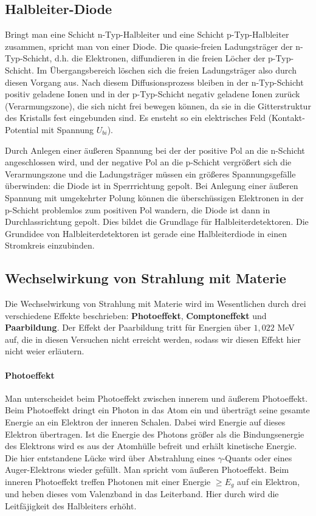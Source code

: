 \documentclass[12pt]{article}
\begin{document}
\subsection{Halbleiter-Diode}

Bringt man eine Schicht n-Typ-Halbleiter und eine Schicht p-Typ-Halbleiter zusammen, spricht man von einer Diode. Die quasie-freien Ladungsträger der n-Typ-Schicht, d.h. die Elektronen, diffundieren in die freien Löcher der p-Typ-Schicht. Im Übergangsbereich löschen sich die freien Ladungsträger also durch diesen Vorgang aus. 
Nach diesem Diffusionsprozess bleiben in der n-Typ-Schicht positiv geladene Ionen und in der p-Typ-Schicht negativ geladene Ionen zurück (Verarmungszone), die sich nicht frei bewegen können, da sie in die Gitterstruktur des Kristalls fest eingebunden sind. Es ensteht so ein elektrisches Feld (Kontakt-Potential mit Spannung $U_{bi}$). 

Durch Anlegen einer äußeren Spannung bei der der positive Pol an die n-Schicht angeschlossen wird, und der negative Pol an die p-Schicht vergrößert sich die Verarmungszone und die Ladungsträger müssen ein größeres Spannungsgefälle überwinden: die Diode ist in Sperrrichtung gepolt. Bei Anlegung einer äußeren Spannung mit umgekehrter Polung können die überschüssigen Elektronen in der p-Schicht problemlos zum positiven Pol wandern, die Diode ist dann in Durchlassrichtung gepolt.
Dies bildet die Grundlage für Halbleiterdetektoren. Die Grundidee von Halbleiterdetektoren ist gerade eine Halbleiterdiode in einen Stromkreis einzubinden.
\subsection{Wechselwirkung von Strahlung mit Materie}

Die Wechselwirkung von Strahlung mit Materie wird im Wesentlichen durch drei verschiedene Effekte beschrieben: \textbf{Photoeffekt}, \textbf{Comptoneffekt} und \textbf{Paarbildung}.
Der Effekt der Paarbildung tritt für Energien über $1,022$ MeV auf, die in diesen Versuchen nicht erreicht werden, sodass wir diesen Effekt hier nicht weier erläutern.

\paragraph{Photoeffekt} Man unterscheidet beim Photoeffekt zwischen innerem und äußerem Photoeffekt.
Beim Photoeffekt dringt ein Photon in das Atom ein und überträgt seine gesamte Energie an ein Elektron der inneren Schalen. Dabei wird Energie auf dieses Elektron übertragen. Ist die Energie des Photons größer als die Bindungsenergie des Elektrons wird es aus der Atomhülle befreit und erhält kinetische Energie. Die hier entstandene Lücke wird über Abstrahlung eines $\gamma$-Quants oder eines Auger-Elektrons wieder gefüllt. Man spricht vom äußeren Photoeffekt.
Beim inneren Photoeffekt treffen Photonen mit einer Energie  $\geq E_g$ auf ein Elektron, und heben dieses vom Valenzband in das Leiterband. Hier durch wird die Leitfäjigkeit des Halbleiters erhöht.
\end{document}
